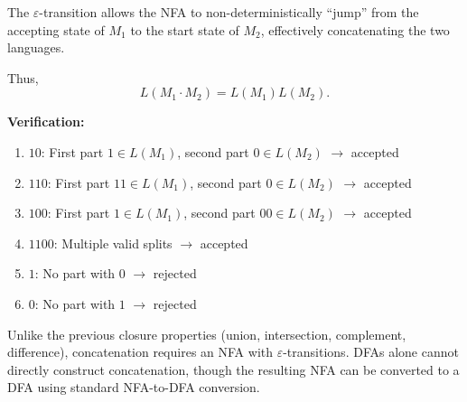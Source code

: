 \documentclass[12pt,a4paper,openany]{article}
\begin{document}
\begin{center}
\end{center}

The $\varepsilon$-transition allows the NFA to non-deterministically ``jump'' from the accepting state of $M_1$ to the start state of $M_2$, effectively concatenating the two languages.

Thus,
\[
L(M_1 \cdot M_2) = L(M_1)L(M_2).
\]

\textbf{Verification:}

\begin{enumerate}
    \item $10$: First part $1 \in L(M_1)$, second part $0 \in L(M_2)$ $\to$ accepted 
    \item $110$: First part $11 \in L(M_1)$, second part $0 \in L(M_2)$ $\to$ accepted 
    \item $100$: First part $1 \in L(M_1)$, second part $00 \in L(M_2)$ $\to$ accepted 
    \item $1100$: Multiple valid splits $\to$ accepted 
    \item $1$: No part with $0$ $\to$ rejected 
    \item $0$: No part with $1$ $\to$ rejected 
\end{enumerate}

Unlike the previous closure properties (union, intersection, complement, difference), concatenation requires an NFA with $\varepsilon$-transitions. DFAs alone cannot directly construct concatenation, though the resulting NFA can be converted to a DFA using standard NFA-to-DFA conversion.
\end{document}
